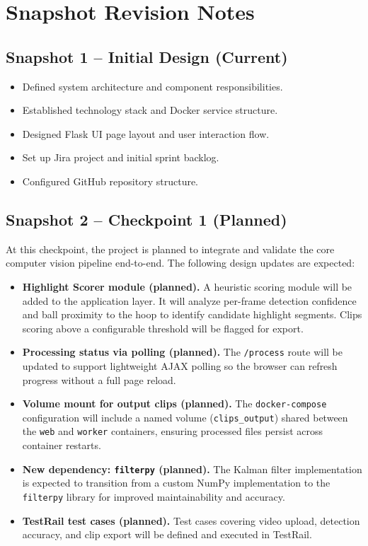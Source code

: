 \documentclass[12pt]{article}
\begin{document}
\newpage

\section{Snapshot Revision Notes}

\subsection{Snapshot 1 -- Initial Design (Current)}
\begin{itemize}[noitemsep]
    \item Defined system architecture and component responsibilities.
    \item Established technology stack and Docker service structure.
    \item Designed Flask UI page layout and user interaction flow.
    \item Set up Jira project and initial sprint backlog.
    \item Configured GitHub repository structure.
\end{itemize}

\subsection{Snapshot 2 -- Checkpoint 1 (Planned)}
At this checkpoint, the project is planned to integrate and validate the core
computer vision pipeline end-to-end. The following design updates are expected:

\begin{itemize}[noitemsep]
    \item \textbf{Highlight Scorer module (planned).} A heuristic scoring module
          will be added to the application layer. It will analyze per-frame detection
          confidence and ball proximity to the hoop to identify candidate highlight
          segments. Clips scoring above a configurable threshold will be flagged
          for export.
    \item \textbf{Processing status via polling (planned).} The \texttt{/process}
          route will be updated to support lightweight AJAX polling so the browser
          can refresh progress without a full page reload.
    \item \textbf{Volume mount for output clips (planned).} The \texttt{docker-compose}
          configuration will include a named volume (\texttt{clips\_output}) shared
          between the \texttt{web} and \texttt{worker} containers, ensuring processed
          files persist across container restarts.
    \item \textbf{New dependency: \texttt{filterpy} (planned).} The Kalman filter
          implementation is expected to transition from a custom NumPy implementation
          to the \texttt{filterpy} library for improved maintainability and accuracy.
    \item \textbf{TestRail test cases (planned).} Test cases covering video upload,
          detection accuracy, and clip export will be defined and executed in TestRail.
\end{itemize}
\end{document}
